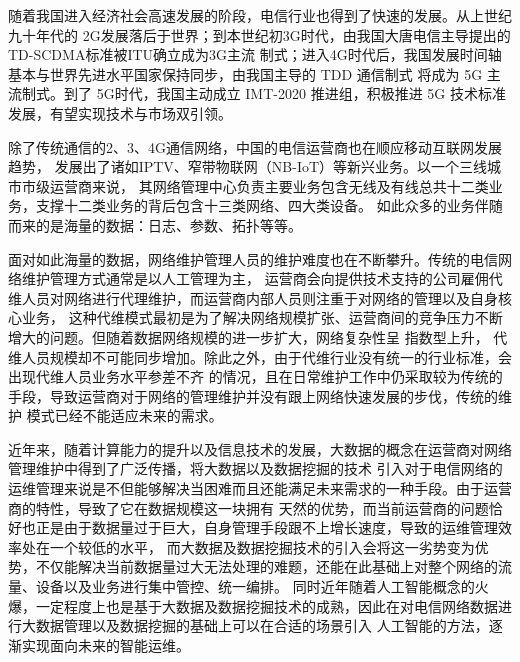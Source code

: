 \documentclass{HustGraduPaper}
\begin{document}
    随着我国进入经济社会高速发展的阶段，电信行业也得到了快速的发展。从上世纪九十年代的
    2G发展落后于世界；到本世纪初3G时代，由我国大唐电信主导提出的TD-SCDMA标准被ITU确立成为3G主流
    制式；进入4G时代后，我国发展时间轴基本与世界先进水平国家保持同步，由我国主导的 TDD 通信制式
    将成为 5G 主流制式。到了 5G时代，我国主动成立 IMT-2020 推进组，积极推进 5G 技术标准发展，有望实现技术与市场双引领。
    
    除了传统通信的2、3、4G通信网络，中国的电信运营商也在顺应移动互联网发展趋势，
    发展出了诸如IPTV、窄带物联网（NB-IoT）等新兴业务。以一个三线城市市级运营商来说，
    其网络管理中心负责主要业务包含无线及有线总共十二类业务，支撑十二类业务的背后包含十三类网络、四大类设备。
    如此众多的业务伴随而来的是海量的数据：日志、参数、拓扑等等。

    面对如此海量的数据，网络维护管理人员的维护难度也在不断攀升。传统的电信网络维护管理方式通常是以人工管理为主，
    运营商会向提供技术支持的公司雇佣代维人员对网络进行代理维护，而运营商内部人员则注重于对网络的管理以及自身核心业务，
    这种代维模式最初是为了解决网络规模扩张、运营商间的竞争压力不断增大的问题。但随着数据网络规模的进一步扩大，网络复杂性呈
    指数型上升，   代维人员规模却不可能同步增加。除此之外，由于代维行业没有统一的行业标准，会出现代维人员业务水平参差不齐
    的情况，且在日常维护工作中仍采取较为传统的手段，导致运营商对于网络的管理维护并没有跟上网络快速发展的步伐，传统的维护
    模式已经不能适应未来的需求。

    近年来，随着计算能力的提升以及信息技术的发展，大数据的概念在运营商对网络管理维护中得到了广泛传播，将大数据以及数据挖掘的技术
    引入对于电信网络的运维管理来说是不但能够解决当困难而且还能满足未来需求的一种手段。由于运营商的特性，导致了它在数据规模这一块拥有
    天然的优势，而当前运营商的问题恰好也正是由于数据量过于巨大，自身管理手段跟不上增长速度，导致的运维管理效率处在一个较低的水平，
    而大数据及数据挖掘技术的引入会将这一劣势变为优势，不仅能解决当前数据量过大无法处理的难题，还能在此基础上对整个网络的流量、设备以及业务进行集中管控、统一编排。
    同时近年随着人工智能概念的火爆，一定程度上也是基于大数据及数据挖掘技术的成熟，因此在对电信网络数据进行大数据管理以及数据挖掘的基础上可以在合适的场景引入
    人工智能的方法，逐渐实现面向未来的智能运维。
    
\end{document}
